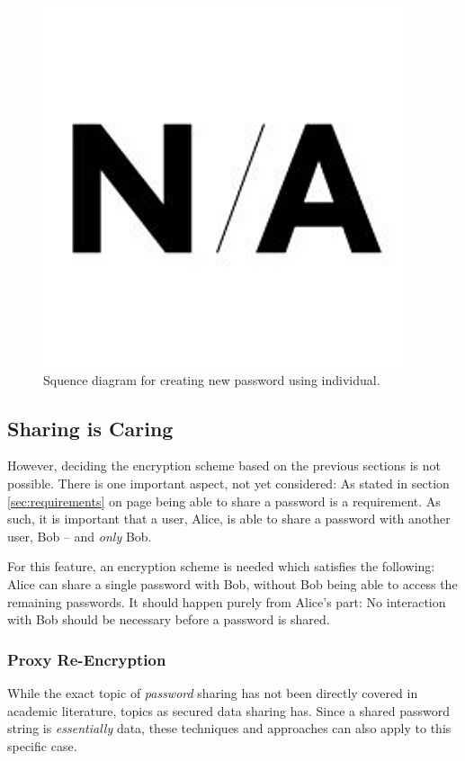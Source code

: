 			\begin{figure}[h!]
				\centering
				\includegraphics[width=\textwidth]{figures/design/na.png}
				\caption{Squence diagram for creating new password using individual.}
				\label{fig:seq_perentry}
			\end{figure}

		\subsection{Sharing is Caring}
			\label{sec:share}
			However, deciding the encryption scheme based on the previous sections is not possible. There is one important aspect, not yet considered: As stated in section \ref{sec:requirements} on page \pageref{sec:requirements} being able to share a password is a requirement. As such, it is important that a user, Alice, is able to share a password with another user, Bob -- and \emph{only} Bob.

			For this feature, an encryption scheme is needed which satisfies the following: Alice can share a single password with Bob, without Bob being able to access the remaining passwords. It should happen purely from Alice's part: No interaction with Bob should be necessary before a password is shared.


			\subsubsection{Proxy Re-Encryption}
				While the exact topic of \emph{password} sharing has not been directly covered in academic literature, topics as secured data sharing has. Since a shared password string is \emph{essentially} data, these techniques and approaches can also apply to this specific case. 

